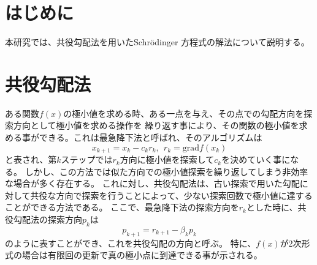 \documentclass[a4j,twocolumn]{jarticle}
\begin{document}
\newcommand{\vv}[1]{\mbox{\boldmath{$#1$}}}
\def\e{{\rm e}}
\topmargin -2.5cm
\textheight 26cm
\raggedbottom



\section{はじめに}
本研究では、共役勾配法を用いたSchr\"odinger  方程式の解法について説明する。

\vspace{-3mm}
\section{共役勾配法}
ある関数$f(x)$の極小値を求める時、ある一点を与え、その点での勾配方向を探索方向として極小値を求める操作を
繰り返す事により、その関数の極小値を求める事ができる。これは最急降下法と呼ばれ、そのアルゴリズムは
\begin{displaymath}
x_{k+1} = x_k-c_kr_k,~~r_k = \mathrm{grad}f(x_k)
\end{displaymath}
と表され、第$k$ステップでは$r_k$方向に極小値を探索して$c_k$を決めていく事になる。
しかし、この方法では似た方向での極小値探索を繰り返してしまう非効率な場合が多く存在する。
これに対し、共役勾配法は、古い探索で用いた勾配に対して共役な方向で探索を行うことによって、少ない探索回数で極小値に達することができる方法である。
ここで、最急降下法の探索方向を$r_k$とした時に、共役勾配法の探索方向$p_k$は
\begin{displaymath}
p_{k+1} = r_{k+1} - \beta_kp_k
\end{displaymath}
のように表すことができ、これを共役勾配の方向と呼ぶ。
特に、$f(x)$が2次形式の場合は有限回の更新で真の極小点に到達できる事が示される。


\vspace{-6mm}
\end{document}
